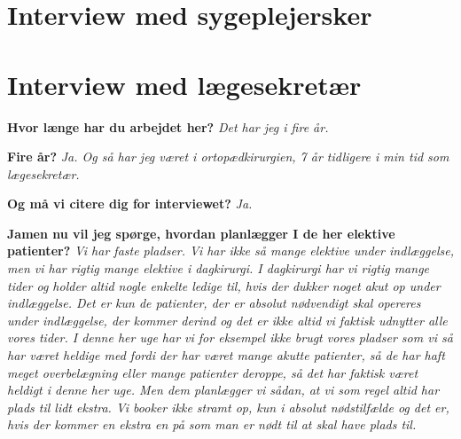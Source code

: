 \section{Interview med sygeplejersker}





\section{Interview med lægesekretær}

\textbf{Hvor længe har du arbejdet her?}
\textit{Det har jeg i fire år.}

\textbf{Fire år?}
\textit{Ja. Og så har jeg været i ortopædkirurgien, 7 år tidligere i min tid som lægesekretær.}


\textbf{Og må vi citere dig for interviewet?}
\textit{Ja.}


\textbf{Jamen nu vil jeg spørge, hvordan planlægger I de her elektive patienter?}
\textit{Vi har faste pladser. Vi har ikke så mange elektive under indlæggelse, men vi har rigtig mange elektive i dagkirurgi. I dagkirurgi har vi rigtig mange tider og  holder altid nogle enkelte ledige til, hvis der dukker noget akut op under indlæggelse. Det er kun de patienter, der er absolut nødvendigt skal opereres under indlæggelse, der kommer derind og det er ikke altid vi faktisk udnytter alle vores tider. I denne her uge har vi for eksempel ikke brugt vores pladser som vi så har været heldige med fordi der har været mange akutte patienter, så de har haft meget overbelægning eller mange patienter deroppe, så det har faktisk været heldigt i denne her uge. Men dem planlægger vi sådan, at vi som regel altid har plads til lidt ekstra. Vi booker ikke stramt op, kun i absolut nødstilfælde og det er, hvis der kommer en ekstra en på som man er nødt til at skal have plads til.}

